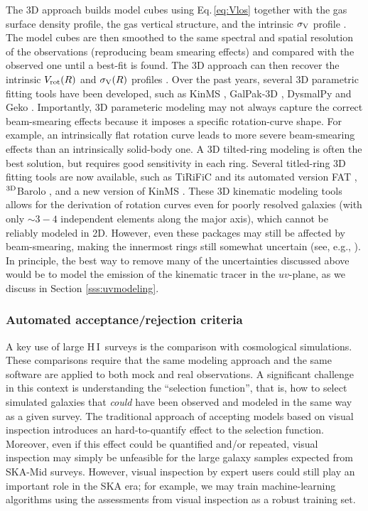 \documentclass[a4paper,11pt]{article}
\newcommand{\hi } {{\rm H}\,{\small\rm I}}
\begin{document}
The 3D approach builds model cubes using Eq.\,\ref{eq:Vlos} together with the gas surface density profile, the gas vertical structure, and the intrinsic $\sigma_{\rm V}$ profile \citep{Corbelli1997, Sicking1997}. The model cubes are then smoothed to the same spectral and spatial resolution of the observations (reproducing beam smearing effects) and compared with the observed one until a best-fit is found. The 3D approach can then recover the intrinsic $V_{\rm rot}(R)$ and $\sigma_{\rm V}(R)$ profiles \citep{Jozsa2007, Swaters2009, DiTeodoro2015}. Over the past years, several 3D parametric fitting tools have been developed, such as KinMS \citep{Davis13}, GalPak-3D \citep{Bouche2015}, DysmalPy \citep{Price2021, Lee2025} and Geko \citep{Danhaive2025}. Importantly, 3D parameteric modeling may not always capture the correct beam-smearing effects because it imposes a specific rotation-curve shape. For example, an intrinsically flat rotation curve leads to more severe beam-smearing effects than an intrinsically solid-body one. A 3D tilted-ring modeling is often the best solution, but requires good sensitivity in each ring. Several titled-ring 3D fitting tools are now available, such as TiRiFiC \citep{Jozsa2007} and its automated version FAT \citep{Kamphuis2015}, $^{\rm 3D}$Barolo \citep{DiTeodoro2015}, and a new version of KinMS \citep{Davis20}. These 3D kinematic modeling tools allows for the derivation of rotation curves even for poorly resolved galaxies (with only $\sim3-4$ independent elements along the major axis), which cannot be reliably modeled in 2D. However, even these packages may still be affected by beam-smearing, making the innermost rings still somewhat uncertain (see, e.g., \citealt{Deg2022}). In principle, the best way to remove many of the uncertainties discussed above would be to model the emission of the kinematic tracer in the $uv$-plane, as we discuss in Section \ref{sss:uvmodeling}.

\subsubsection{Automated acceptance/rejection criteria}\label{sec:accept/reject}

A key use of large \hi\, surveys is the comparison with cosmological simulations. These comparisons require that the same modeling approach and the same software are applied to both mock and real observations. A significant challenge in this context is understanding the ``selection function'', that is, how to select simulated galaxies that \textit{could} have been observed and modeled in the same way as a given survey. The traditional approach of accepting models based on visual inspection \citep[e.g.,][]{Deg2022} introduces an hard-to-quantify effect to the selection function.  Moreover, even if this effect could be quantified and/or repeated, visual inspection may simply be unfeasible for the large galaxy samples expected from SKA-Mid surveys. However, visual inspection by expert users could still play an important role in the SKA era; for example, we may train machine-learning algorithms using the assessments from visual inspection as a robust training set.
\end{document}
